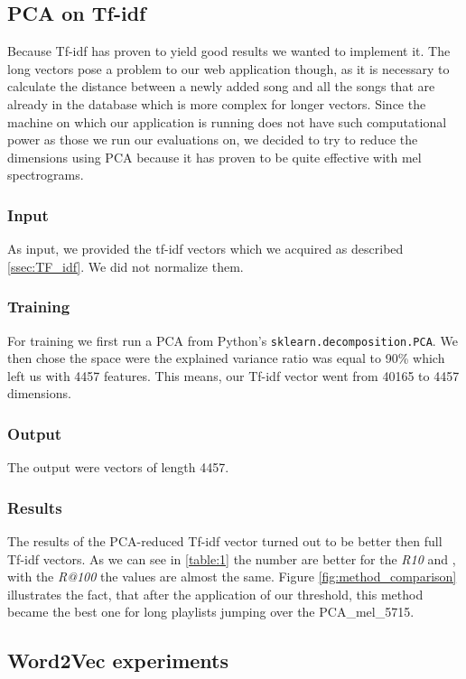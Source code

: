 \subsection{PCA on Tf-idf}\label{ssec:PCA_on_tf_idf}

Because Tf-idf has proven to yield good results we wanted to implement it. The long vectors pose a problem to our web application though, as it is necessary to calculate the distance between a newly added song and all the songs that are already in the database which is more complex for longer vectors. Since the machine on which our application is running does not have such computational power as those we run our evaluations on, we decided to try to reduce the dimensions using PCA because it has proven to be quite effective with mel spectrograms.

\subsubsection{Input}
As input, we provided the tf-idf vectors which we acquired as described \ref{ssec:TF_idf}. We did not normalize them.

\subsubsection{Training}
For training we first run a PCA from Python's \texttt{sklearn.decomposition.PCA}. We then chose the space were the explained variance ratio was equal to 90\% which left us with 4457 features. This means, our Tf-idf vector went from 40165 to 4457 dimensions. 

\subsubsection{Output}
The output were vectors of length 4457.

\subsubsection{Results}
The results of the PCA-reduced Tf-idf vector turned out to be better then full Tf-idf vectors. As we can see in \ref{table:1} the number are better for the \textit{R10} and , with the \textit{R@100} the values are almost the same. Figure \ref{fig:method_comparison} illustrates the fact, that after the application of our threshold, this method became the best one for long playlists jumping over the PCA\_mel\_5715. 

\subsection{Word2Vec experiments}\label{ssec:w2v_experiments}

